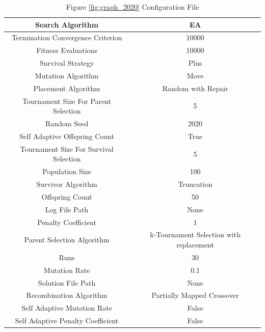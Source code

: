 \documentclass{standalone}
\begin{document}
\begin{table}[!htb]
	\centering
	\caption{Figure \ref{fig:graph_2020} Configuration File}
	\label{tab:graph_2020}
	\begin{tabular}{| c | c |}
		\hline
		Search Algorithm		& EA		 \\
		\hline
		Termination Convergence Criterion		& 10000		 \\
		\hline
		Fitness Evaluations		& 10000		 \\
		\hline
		Survival Strategy		& Plus		 \\
		\hline
		Mutation Algorithm		& Move		 \\
		\hline
		Placement Algorithm		& Random with Repair		 \\
		\hline
		Tournament Size For Parent Selection		& 5		 \\
		\hline
		Random Seed		& 2020		 \\
		\hline
		Self Adaptive Offspring Count		& True		 \\
		\hline
		Tournament Size For Survival Selection		& 5		 \\
		\hline
		Population Size		& 100		 \\
		\hline
		Survivor Algorithm		& Truncation		 \\
		\hline
		Offspring Count		& 50		 \\
		\hline
		Log File Path		& None		 \\
		\hline
		Penalty Coefficient		& 1		 \\
		\hline
		Parent Selection Algorithm		& k-Tournament Selection with replacement		 \\
		\hline
		Runs		& 30		 \\
		\hline
		Mutation Rate		& 0.1		 \\
		\hline
		Solution File Path		& None		 \\
		\hline
		Recombination Algorithm		& Partially Mapped Crossover		 \\
		\hline
		Self Adaptive Mutation Rate		& False		 \\
		\hline
		Self Adaptive Penalty Coefficient		& False		 \\
		\hline
	\end{tabular}
\end{table}
\end{document}
